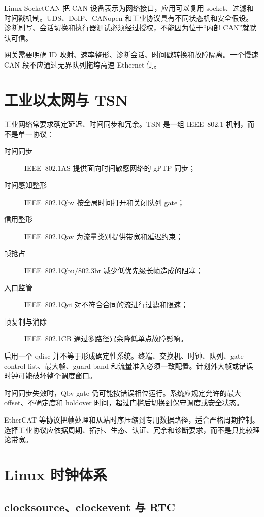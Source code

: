 Linux SocketCAN 把 CAN 设备表示为网络接口，应用可以复用 socket、过滤和时间戳机制。UDS、DoIP、CANopen 和工业协议具有不同状态机和安全假设。诊断刷写、会话切换和执行器测试必须经过授权，不能因为位于“内部 CAN”就默认可信。

网关需要明确 ID 映射、速率整形、诊断会话、时间戳转换和故障隔离。一个慢速 CAN 段不应通过无界队列拖垮高速 Ethernet 侧。

\section{工业以太网与 TSN}

工业网络常要求确定延迟、时间同步和冗余。TSN 是一组 IEEE~802.1 机制，而不是单一协议：

\begin{description}
  \item[时间同步] IEEE~802.1AS 提供面向时间敏感网络的 gPTP 同步\cite{ieee8021as-2020}；
  \item[时间感知整形] IEEE~802.1Qbv 按全局时间打开和关闭队列 gate；
  \item[信用整形] IEEE~802.1Qav 为流量类别提供带宽和延迟约束；
  \item[帧抢占] IEEE~802.1Qbu/802.3br 减少低优先级长帧造成的阻塞；
  \item[入口监管] IEEE~802.1Qci 对不符合合同的流进行过滤和限速；
  \item[帧复制与消除] IEEE~802.1CB 通过多路径冗余降低单点故障影响。
\end{description}

启用一个 qdisc 并不等于形成确定性系统。终端、交换机、时钟、队列、gate control list、最大帧、guard band 和流量准入必须一致配置。计划外大帧或错误时钟可能破坏整个调度窗口。

时间同步失效时，Qbv gate 仍可能按错误相位运行。系统应规定允许的最大 offset、不确定度和 holdover 时间，超过门槛后切换到保守调度或安全状态。

EtherCAT 等协议把帧处理和从站时序压缩到专用数据路径，适合严格周期控制。选择工业协议应依据周期、拓扑、生态、认证、冗余和诊断要求，而不是只比较理论带宽。

\section{Linux 时钟体系}

\subsection{clocksource、clockevent 与 RTC}

